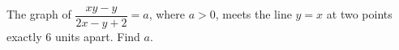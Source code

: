 The graph of $\dfrac{xy-y}{2x-y+2}=a$, where $a>0$, meets the line $y=x$ at two points exactly $6$ units apart. Find $a$.

